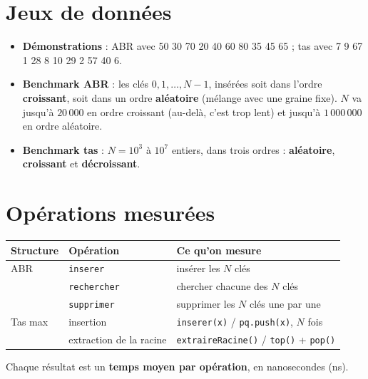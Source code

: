 \documentclass[12pt,a4paper]{report}
\begin{document}
\section{Jeux de données}
\begin{itemize}
  \item \textbf{Démonstrations} : ABR avec 50 30 70 20 40 60 80 35 45 65 ; tas avec 7 9 67 1 28 8 10 29 2 57 40 6.
  \item \textbf{Benchmark ABR} : les clés $0,1,\dots,N-1$, insérées soit dans l'ordre \textbf{croissant}, soit dans un ordre \textbf{aléatoire} (mélange avec une graine fixe). $N$ va jusqu'à $20\,000$ en ordre croissant (au-delà, c'est trop lent) et jusqu'à $1\,000\,000$ en ordre aléatoire.
  \item \textbf{Benchmark tas} : $N = 10^3$ à $10^7$ entiers, dans trois ordres : \textbf{aléatoire}, \textbf{croissant} et \textbf{décroissant}.
\end{itemize}

\section{Opérations mesurées}
\begin{center}\small
\begin{tabular}{lll}
  \toprule
  Structure & Opération & Ce qu'on mesure \\
  \midrule
  ABR & \texttt{inserer} & insérer les $N$ clés \\
      & \texttt{rechercher} & chercher chacune des $N$ clés \\
      & \texttt{supprimer} & supprimer les $N$ clés une par une \\
  \midrule
  Tas max & insertion & \texttt{inserer(x)} / \texttt{pq.push(x)}, $N$ fois \\
          & extraction de la racine & \texttt{extraireRacine()} / \texttt{top()} + \texttt{pop()} \\
  \bottomrule
\end{tabular}
\end{center}
Chaque résultat est un \textbf{temps moyen par opération}, en nanosecondes (ns).
\end{document}
